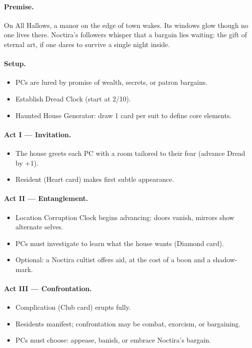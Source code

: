 \documentclass[11pt]{article}
\begin{document}
\paragraph{Premise.}
On All Hallows, a manor on the edge of town wakes. Its windows glow though no one lives there. Noctira’s followers whisper that a bargain lies waiting: the gift of eternal art, if one dares to survive a single night inside.

\paragraph{Setup.}
\begin{itemize}
  \item PCs are lured by promise of wealth, secrets, or patron bargains.
  \item Establish Dread Clock (start at 2/10).
  \item Haunted House Generator: draw 1 card per suit to define core elements.
\end{itemize}

\paragraph{Act I — Invitation.}
\begin{itemize}
  \item The house greets each PC with a room tailored to their fear (advance Dread by +1).
  \item Resident (Heart card) makes first subtle appearance.
\end{itemize}

\paragraph{Act II — Entanglement.}
\begin{itemize}
  \item Location Corruption Clock begins advancing: doors vanish, mirrors show alternate selves.
  \item PCs must investigate to learn what the house wants (Diamond card).
  \item Optional: a Noctira cultist offers aid, at the cost of a boon and a shadow-mark.
\end{itemize}

\paragraph{Act III — Confrontation.}
\begin{itemize}
  \item Complication (Club card) erupts fully.
  \item Residents manifest; confrontation may be combat, exorcism, or bargaining.
  \item PCs must choose: appease, banish, or embrace Noctira’s bargain.
\end{itemize}
\end{document}
